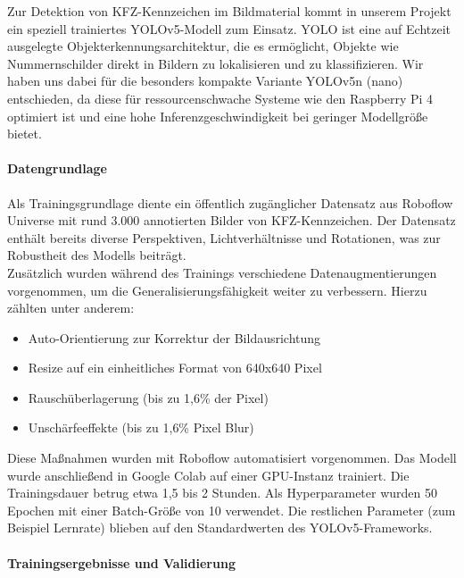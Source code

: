 Zur Detektion von KFZ-Kennzeichen im Bildmaterial kommt in unserem Projekt ein speziell trainiertes YOLOv5-Modell zum Einsatz. YOLO  ist eine auf Echtzeit ausgelegte Objekterkennungsarchitektur, die es ermöglicht, Objekte wie Nummernschilder direkt in Bildern zu lokalisieren und zu klassifizieren. Wir haben uns dabei für die besonders kompakte Variante YOLOv5n (nano) entschieden, da diese für ressourcenschwache Systeme wie den Raspberry Pi 4 optimiert ist und eine hohe Inferenzgeschwindigkeit bei geringer Modellgröße bietet.

\paragraph{Datengrundlage\cite{roboflowdataset}}

Als Trainingsgrundlage diente ein öffentlich zugänglicher Datensatz aus Roboflow Universe mit rund 3.000 annotierten Bilder von KFZ-Kennzeichen. Der Datensatz enthält bereits diverse Perspektiven, Lichtverhältnisse und Rotationen, was zur Robustheit des Modells beiträgt.\\

Zusätzlich wurden während des Trainings verschiedene Datenaugmentierungen vorgenommen, um die Generalisierungsfähigkeit weiter zu verbessern. Hierzu zählten unter anderem:

\begin{itemize}
    \item Auto-Orientierung zur Korrektur der Bildausrichtung
    \item Resize auf ein einheitliches Format von 640x640 Pixel
    \item Rauschüberlagerung (bis zu 1{,}6\% der Pixel)
    \item Unschärfeeffekte (bis zu 1{,}6\% Pixel Blur)
  \end{itemize}

Diese Maßnahmen wurden mit Roboflow automatisiert vorgenommen. Das Modell wurde anschließend in Google Colab auf einer GPU-Instanz trainiert. Die Trainingsdauer betrug etwa 1,5 bis 2 Stunden. Als Hyperparameter wurden 50 Epochen mit einer Batch-Größe von 10 verwendet. Die restlichen Parameter (zum Beispiel Lernrate) blieben auf den Standardwerten des YOLOv5-Frameworks.

\paragraph{Trainingsergebnisse und Validierung}{}

